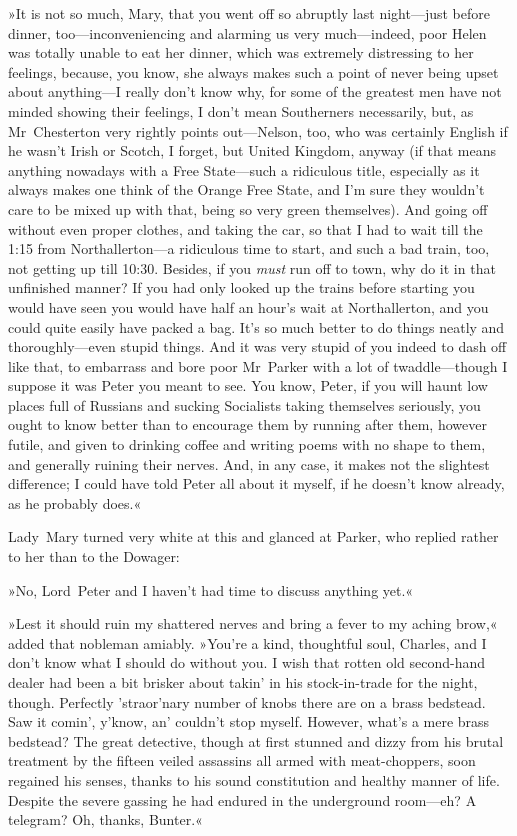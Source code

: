»It is not so much, Mary, that you went off so abruptly last night—just before dinner, too—inconveniencing and alarming us very much—indeed, poor Helen was totally unable to eat her dinner, which was extremely distressing to her feelings, because, you know, she always makes such a point of never being upset about anything—I really don't know why, for some of the greatest men have not minded showing their feelings, I don't mean Southerners necessarily, but, as Mr~Chesterton very rightly points out—Nelson, too, who was certainly English if he wasn't Irish or Scotch, I forget, but United Kingdom, anyway (if that means anything nowadays with a Free State—such a ridiculous title, especially as it always makes one think of the Orange Free State, and I'm sure they wouldn't care to be mixed up with that, being so very green themselves). And going off without even proper clothes, and taking the car, so that I had to wait till the 1:15 from Northallerton—a ridiculous time to start, and such a bad train, too, not getting up till 10:30. Besides, if you \textit{must} run off to town, why do it in that unfinished manner? If you had only looked up the trains before starting you would have seen you would have half an hour's wait at Northallerton, and you could quite easily have packed a bag.  It's so much better to do things neatly and thoroughly—even stupid things. And it was very stupid of you indeed to dash off like that, to embarrass and bore poor Mr~Parker with a lot of twaddle—though I suppose it was Peter you meant to see. You know, Peter, if you will haunt low places full of Russians and sucking Socialists taking themselves seriously, you ought to know better than to encourage them by running after them, however futile, and given to drinking coffee and writing poems with no shape to them, and generally ruining their nerves. And, in any case, it makes not the slightest difference; I could have told Peter all about it myself, if he doesn't know already, as he probably does.«

Lady~Mary turned very white at this and glanced at Parker, who replied rather to her than to the Dowager:

»No, Lord~Peter and I haven't had time to discuss anything yet.«

»Lest it should ruin my shattered nerves and bring a fever to my aching brow,« added that nobleman amiably. »You're a kind, thoughtful soul, Charles, and I don't know what I should do without you. I wish that rotten old second-hand dealer had been a bit brisker about takin' in his stock-in-trade for the night, though. Perfectly 'straor'nary number of knobs there are on a brass bedstead. Saw it comin', y'know, an' couldn't stop myself. However, what's a mere brass bedstead? The great detective, though at first stunned and dizzy from his brutal treatment by the fifteen veiled assassins all armed with meat-choppers, soon regained his senses, thanks to his sound constitution and healthy manner of life. Despite the severe gassing he had endured in the underground room—eh? A telegram? Oh, thanks, Bunter.«

